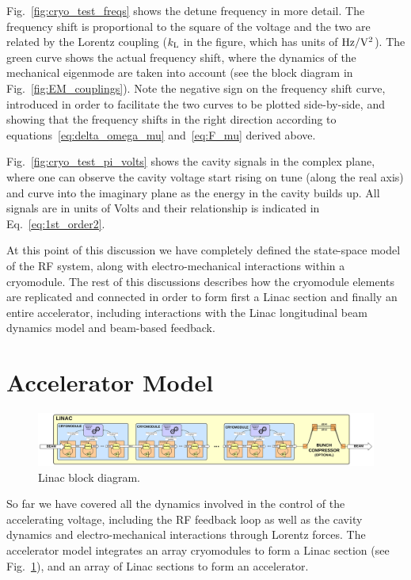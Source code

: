 \documentclass[a4paper,12pt]{article}
\begin{document}
Fig.~\ref{fig:cryo_test_freqs} shows the detune frequency in more detail. The frequency shift is proportional to the square of the voltage and the two are related by the Lorentz coupling ($k_{\rm L}$ in the figure, which has units of $\rm Hz/V^2$). The green curve shows the actual frequency shift, where the dynamics of the mechanical eigenmode are taken into account (see the block diagram in Fig.~\ref{fig:EM_couplings}). Note the negative sign on the frequency shift curve, introduced in order to facilitate the two curves to be plotted side-by-side, and showing that the frequency shifts in the right direction according to equations~\ref{eq:delta_omega_mu} and~\ref{eq:F_mu} derived above.

Fig.~\ref{fig:cryo_test_pi_volts} shows the cavity signals in the complex plane, where one can observe the cavity voltage start rising on tune (along the real axis) and curve into the imaginary plane as the energy in the cavity builds up. All signals are in units of Volts and their relationship is indicated in Eq.~\ref{eq:1st_order2}.

At this point of this discussion we have completely defined the state-space model of the RF system, along with electro-mechanical interactions within a cryomodule. The rest of this discussions describes how the cryomodule elements are replicated and connected in order to form first a Linac section and finally an entire accelerator, including interactions with the Linac longitudinal beam dynamics model and beam-based feedback.

\clearpage
\newpage

\section{Accelerator Model}

\begin{figure}
\centering
\includegraphics[scale=0.45]{../figures/Linac_block_diagram.png}
\caption{Linac block diagram.}
\label{fig:Linac_block_diagram}
\end{figure}

So far we have covered all the dynamics involved in the control of the accelerating voltage, including the RF feedback loop as well as the cavity dynamics and electro-mechanical interactions through Lorentz forces. The accelerator model integrates an array cryomodules to form a Linac section (see Fig.~\ref{fig:Linac_block_diagram}), and an array of Linac sections to form an accelerator.
\end{document}
